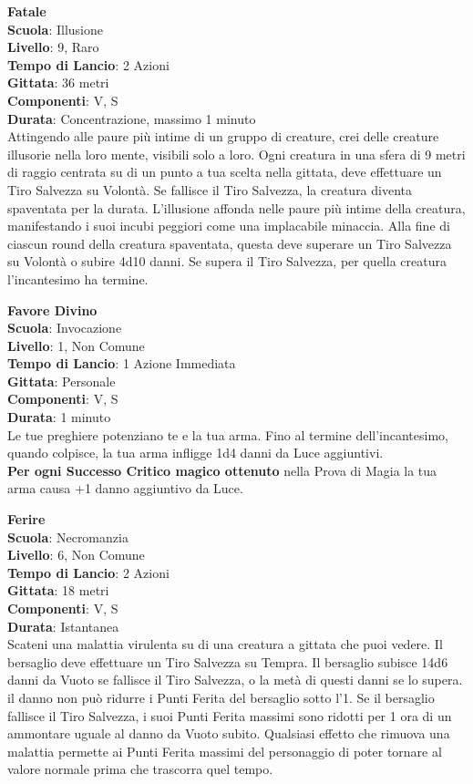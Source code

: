 \begin{multicols}{2}
\medskip\textbf{Fatale}\\
\textbf{Scuola}: Illusione\\
\textbf{Livello}: 9, Raro\\
\textbf{Tempo di Lancio}: 2 Azioni\\
\textbf{Gittata}: 36 metri\\
\textbf{Componenti}: V, S\\
\textbf{Durata}: Concentrazione, massimo 1 minuto\\
Attingendo alle paure più intime di un gruppo di creature, crei delle creature illusorie nella loro mente, visibili solo a loro. Ogni creatura in una sfera di 9 metri di raggio centrata su di un punto a tua scelta nella gittata, deve effettuare un Tiro Salvezza su Volontà. Se fallisce il Tiro Salvezza, la creatura diventa spaventata per la durata. L'illusione affonda nelle paure più intime della creatura, manifestando i suoi incubi peggiori come una implacabile minaccia. Alla fine di ciascun round della creatura spaventata, questa deve superare un Tiro Salvezza su Volontà o subire 4d10 danni. Se supera il Tiro Salvezza, per quella creatura l'incantesimo ha termine.

\medskip\textbf{Favore Divino}\\
\textbf{Scuola}: Invocazione\\
\textbf{Livello}: 1, Non Comune\\
\textbf{Tempo di Lancio}: 1 Azione Immediata\\
\textbf{Gittata}: Personale\\
\textbf{Componenti}: V, S\\
\textbf{Durata}: 1 minuto\\
Le tue preghiere potenziano te e la tua arma. Fino al termine dell'incantesimo, quando colpisce, la tua arma infligge 1d4 danni da Luce aggiuntivi.\\
\textbf{Per ogni Successo Critico magico ottenuto} nella Prova di Magia la tua arma causa +1 danno aggiuntivo da Luce.

\medskip\textbf{Ferire}\\
\textbf{Scuola}: Necromanzia\\
\textbf{Livello}: 6, Non Comune\\
\textbf{Tempo di Lancio}: 2 Azioni\\
\textbf{Gittata}: 18 metri\\
\textbf{Componenti}: V, S\\
\textbf{Durata}: Istantanea\\
Scateni una malattia virulenta su di una creatura a gittata che puoi vedere. Il bersaglio deve effettuare un Tiro Salvezza su Tempra. Il bersaglio subisce 14d6 danni da Vuoto se fallisce il Tiro Salvezza, o la metà di questi danni se lo supera. il danno non può ridurre i Punti Ferita del bersaglio sotto l'1. Se il bersaglio fallisce il Tiro Salvezza, i suoi Punti Ferita massimi sono ridotti per 1 ora di un ammontare uguale al danno da Vuoto subito. Qualsiasi effetto che rimuova una malattia permette ai Punti Ferita massimi del personaggio di poter tornare al valore normale prima che trascorra quel tempo.


\end{multicols}
